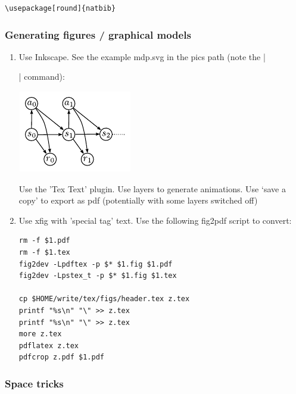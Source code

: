 \begin{code}
\begin{verbatim}
\usepackage[round]{natbib}

\end{verbatim}
\end{code}

\subsubsection{Generating figures / graphical models}

\begin{enumerate}

\item Use Inkscape. See the example mdp.svg in the pics path (note
the |\graphicspath{{pics/}}| command):

\centerline{\includegraphics[scale=.5]{mdp}}


  Use the 'Tex Text' plugin. Use layers to generate animations. Use
  `save a copy' to export as pdf (potentially with some layers
  switched off)

\item Use xfig with 'special tag' text. Use the following fig2pdf script to
  convert:

\begin{code}
\begin{verbatim}
rm -f $1.pdf
rm -f $1.tex
fig2dev -Lpdftex -p $* $1.fig $1.pdf
fig2dev -Lpstex_t -p $* $1.fig $1.tex

cp $HOME/write/tex/figs/header.tex z.tex
printf "%s\n" "\" >> z.tex
printf "%s\n" "\" >> z.tex
more z.tex
pdflatex z.tex
pdfcrop z.pdf $1.pdf
\end{verbatim}
\end{code}
\end{enumerate}



\subsubsection{Space tricks}

